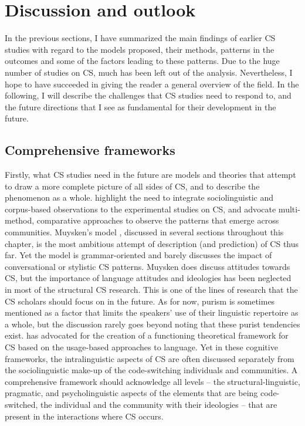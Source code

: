 \documentclass[output=paper]{langscibook}
\begin{document}
\section{Discussion and outlook}
In the previous sections, I have summarized the main findings of earlier CS studies with regard to the models proposed, their methods, patterns in the outcomes and some of the factors leading to these patterns. Due to the huge number of studies on CS, much has been left out of the analysis. Nevertheless, I hope to have succeeded in giving the reader a general overview of the field.  In the following, I will describe the challenges that CS studies need to respond to, and the future directions that I see as fundamental for their development in the future.

\subsection{Comprehensive frameworks} \label{subsubsec-comprehensive}
Firstly, what CS studies need in the future are models and theories that attempt to draw a more complete picture of all sides of CS, and to describe the phenomenon as a whole. 
\textcite{tomicetal2022expecting} highlight the need to integrate sociolinguistic and corpus-based observations to the experimental studies on CS, and \textcite{coutoetal2021code-switching} advocate multi-method, comparative approaches to observe the patterns that emerge across communities.
Muysken’s model \parencite{muysken2000,muysken2013language}, discussed in several sections throughout this chapter, is the most ambitious attempt of description (and prediction) of CS thus far. Yet the model is grammar-oriented and barely discusses the impact of conversational or stylistic CS patterns. Muysken does discuss attitudes towards CS, but the importance of language attitudes and ideologies has been neglected in most of the structural CS research. This is one of the lines of research that the CS scholars should focus on in the future. As for now, purism is sometimes mentioned as a factor that limits the speakers’ use of their linguistic repertoire as a whole, but the discussion rarely goes beyond noting that these purist tendencies exist. \textcite{backus2013usage, backus2015usage} has advocated for the creation of a functioning theoretical framework for CS based on the usage-based approaches to language. Yet in these cognitive frameworks, the intralinguistic aspects of CS are often discussed separately from the sociolinguistic make-up of the code-switching individuals and communities. A comprehensive framework should acknowledge all levels – the structural-linguistic, pragmatic, and psycholinguistic aspects of the elements that are being code-switched, the individual and the community with their ideologies – that are present in the interactions where CS occurs.
\end{document}
